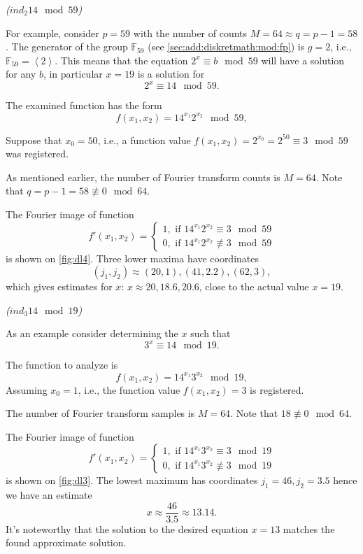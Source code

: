 \begin{example}
\emph{($ind_2{14} \mod{59}$)}

For example, consider $p = 59$ with the number of counts $M = 64
\approx q = p - 1 = 58$. The generator of the group $\mathbb{F}_{59}$ (see \autoref{sec:add:diskretmath:mod:fp}) 
is $g = 2$, i.e., $\mathbb{F}_{59} = \left<2\right>$. This means that the equation $2^x \equiv b \mod 59$ will have a solution for any $b$, in particular $x = 19$ is a solution for
\[
2^x \equiv 14 \mod 59.
\] 

The examined function has the form
\[
f(x_1, x_2) = 14^{x_1} 2^{x_2} \mod 59,
\]

Suppose that $x_0 = 50$, i.e., a function value $f(x_1, x_2) = 2^{x_0} = 2^{50} \equiv 3 \mod 59$ was registered.



As mentioned earlier, the number of Fourier transform counts is $M=64$. Note that $q = p - 1 = 58 \not\equiv 0 \mod 64$.

The Fourier image of function 
\[
f'(x_1, x_2) = 
\begin{cases}
1, \mbox{ if } 14^{x_1} 2^{x_2} \equiv 3 \mod 59 \\
0, \mbox{ if } 14^{x_1} 2^{x_2} \not\equiv 3 \mod 59 
\end{cases}
\]
is shown on \autoref{fig:dl4}.
Three lower maxima have coordinates 
\[
(j_1, j_2) \approx (20,1), (41,2.2), (62,3), 
\]
which gives estimates for $x$: $x \approx 20, 18.6, 20.6$, 
close to the actual value $x = 19$.
\label{ex:discretlog:periodfinding3}
\end{example}

\begin{example}
\emph{($ind_3{14} \mod{19}$)}

As an example consider determining the $x$ such that
\[
3^x \equiv 14 \mod 19.
\]

The function to analyze is
\[
f(x_1, x_2) = 14^{x_1} 3^{x_2} \mod 19,
\]
Assuming $x_0 = 1$, i.e., the function value $f(x_1, x_2) = 3$ is registered.



The number of Fourier transform samples is $M=64$. Note that $18 \not\equiv 0 \mod 64$.

The Fourier image of function 
\[
f'(x_1, x_2) = 
\begin{cases}
1, \mbox{ if } 14^{x_1} 3^{x_2} \equiv 3 \mod 19 \\
0, \mbox{ if } 14^{x_1} 3^{x_2} \not\equiv 3 \mod 19 
\end{cases}
\]
is shown on \autoref{fig:dl3}. The lowest maximum has coordinates $j_1 = 46, j_2 = 3.5$ hence we have an estimate 
\[
x \approx \frac{46}{3.5} \approx 13.14.
\]
It's noteworthy that the solution to the desired equation $x = 13$ matches the found approximate solution.
\label{ex:discretlog:periodfinding2}
\end{example}

